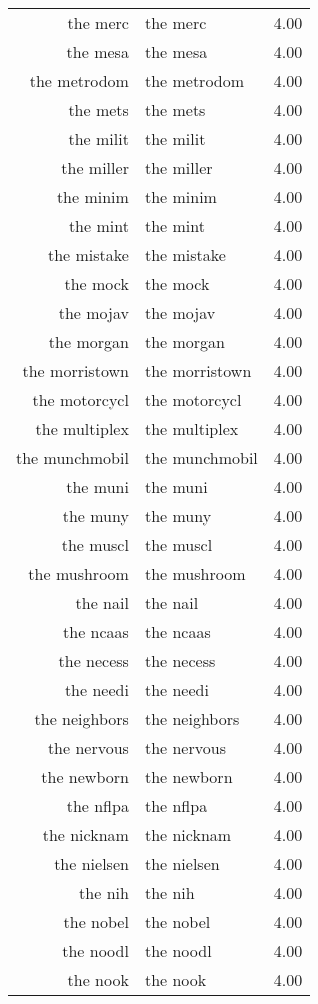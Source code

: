 \begin{table}[ht]
\begin{tabular}{rlr}
  the merc & the merc & 4.00 \\ 
  the mesa & the mesa & 4.00 \\ 
  the metrodom & the metrodom & 4.00 \\ 
  the mets & the mets & 4.00 \\ 
  the milit & the milit & 4.00 \\ 
  the miller & the miller & 4.00 \\ 
  the minim & the minim & 4.00 \\ 
  the mint & the mint & 4.00 \\ 
  the mistake & the mistake & 4.00 \\ 
  the mock & the mock & 4.00 \\ 
  the mojav & the mojav & 4.00 \\ 
  the morgan & the morgan & 4.00 \\ 
  the morristown & the morristown & 4.00 \\ 
  the motorcycl & the motorcycl & 4.00 \\ 
  the multiplex & the multiplex & 4.00 \\ 
  the munchmobil & the munchmobil & 4.00 \\ 
  the muni & the muni & 4.00 \\ 
  the muny & the muny & 4.00 \\ 
  the muscl & the muscl & 4.00 \\ 
  the mushroom & the mushroom & 4.00 \\ 
  the nail & the nail & 4.00 \\ 
  the ncaas & the ncaas & 4.00 \\ 
  the necess & the necess & 4.00 \\ 
  the needi & the needi & 4.00 \\ 
  the neighbors & the neighbors & 4.00 \\ 
  the nervous & the nervous & 4.00 \\ 
  the newborn & the newborn & 4.00 \\ 
  the nflpa & the nflpa & 4.00 \\ 
  the nicknam & the nicknam & 4.00 \\ 
  the nielsen & the nielsen & 4.00 \\ 
  the nih & the nih & 4.00 \\ 
  the nobel & the nobel & 4.00 \\ 
  the noodl & the noodl & 4.00 \\ 
  the nook & the nook & 4.00 \\ 

\end{tabular}
\end{table}
